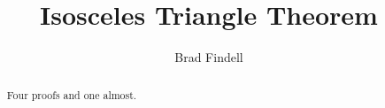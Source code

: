 \documentclass[nooutcomes]{ximera}
\title{Isosceles Triangle Theorem}
\author{Brad Findell}
\begin{document}
\begin{abstract}
Four proofs and one almost. 
\end{abstract}
\maketitle

%
%


\end{document}
